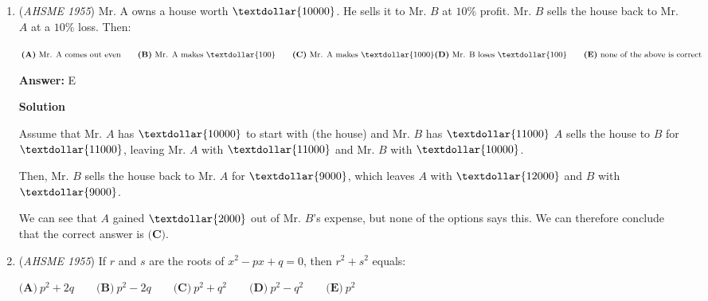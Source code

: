 \begin{enumerate}
 $x^2 + 3$ leaves behind a remainder, and so does $x^2 - 3$.

 In addition, $x + 1$ also fails the test, and that takes down $x^2 - 2x - 3$, which can be expressed as $(x + 1)(x - 3)$. That leaves $\boxed{(\textbf{E})}$




\textbf{Solution 2 (direct factorization)}

Notice the leading and constant terms are begging us to create a binomial. So
 \[x^4 + 2x^2 + 9 = (x^4 + 6x^2 + 9) - 4x^2 = (x^2 + 3)^2 - (2x)^2 = (x^2 + 2x + 3)(x^2 - 2x + 3),\]where both quadratics are irreducible (over the field of real numbers).Hence none of the given options is a factor. So the answer is $\boxed{(\textbf{E})}$



	\item (\textit{AHSME 1955}) Mr. A owns a house worth $\textdollar{10000}$. He sells it to Mr. $B$ at $10$\% profit. Mr. $B$ sells the house back to Mr. $A$ at a $10$\% loss. Then: 


 $\textbf{(A)}\ \text{Mr. A comes out even}\qquad\textbf{(B)}\ \text{Mr. A makes } \textdollar{ 100}\qquad\textbf{(C)}\ \text{Mr. A makes } \textdollar{ 1000}\\ \textbf{(D)}\ \text{Mr. B loses } \textdollar{ 100}\qquad\textbf{(E)}\ \text{none of the above is correct}$

 \textbf{Answer: }E



\textbf{Solution}

Assume that Mr. $A$ has $\textdollar{10000}$ to start with (the house) and Mr. $B$ has $\textdollar{11000}$
$A$ sells the house to $B$ for $\textdollar{11000}$, leaving Mr. $A$ with $\textdollar{11000}$ and Mr. $B$ with $\textdollar{10000}$. 

 Then, Mr. $B$ sells the house back to Mr. $A$ for $\textdollar{9000}$, which leaves $A$ with $\textdollar{12000}$ and $B$ with $\textdollar{9000}$.

 We can see that $A$ gained $\textdollar{2000}$ out of Mr. $B$'s expense, but none of the options says this. We can therefore conclude that the correct answer is $\boxed{\textbf{(C)}}$.

 


	\item (\textit{AHSME 1955}) If $r$ and $s$ are the roots of $x^2-px+q=0$, then $r^2+s^2$ equals: 


 $\textbf{(A)}\ p^2+2q\qquad\textbf{(B)}\ p^2-2q\qquad\textbf{(C)}\ p^2+q^2\qquad\textbf{(D)}\ p^2-q^2\qquad\textbf{(E)}\ p^2$


\end{enumerate}
